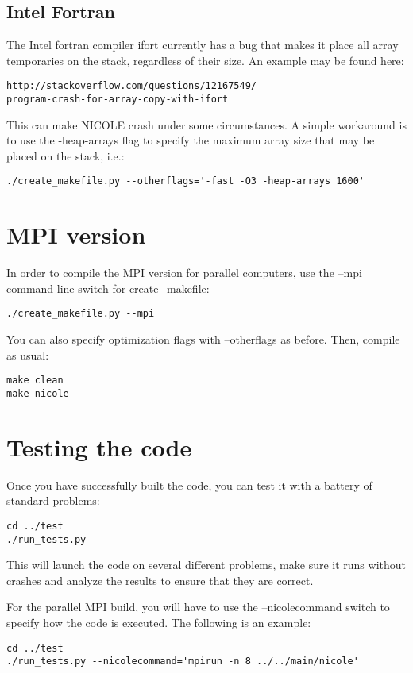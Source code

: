 \subsection{Intel Fortran}
The Intel fortran compiler ifort currently has a bug that makes it
place all array temporaries on the stack, regardless of their
size. An example may be found here:
\begin{verbatim}
http://stackoverflow.com/questions/12167549/
program-crash-for-array-copy-with-ifort
\end{verbatim}
This can make NICOLE crash under some circumstances. A simple
workaround is to use the -heap-arrays flag to specify the maximum array
size that may be placed on the stack, i.e.:
\begin{verbatim}
./create_makefile.py --otherflags='-fast -O3 -heap-arrays 1600'
\end{verbatim}


\section{MPI version}
\label{sec:MPI}

In order to compile the MPI version for parallel computers, use the
--mpi command line switch for create\_makefile:
\begin{verbatim}
./create_makefile.py --mpi
\end{verbatim}

You can also specify optimization flags with --otherflags as
before. Then, compile as usual:
\begin{verbatim}
make clean
make nicole
\end{verbatim}

\section{Testing the code}

Once you have successfully built the code, you can test it with a
battery of standard problems:
\begin{verbatim}
cd ../test
./run_tests.py
\end{verbatim}
This will launch the code on several different problems, make sure it
runs without crashes and analyze the results to ensure that they are
correct. 

For the parallel MPI build, you will have to use the --nicolecommand
switch to specify how the code is executed. The following is an
example:
\begin{verbatim}
cd ../test
./run_tests.py --nicolecommand='mpirun -n 8 ../../main/nicole'
\end{verbatim}


